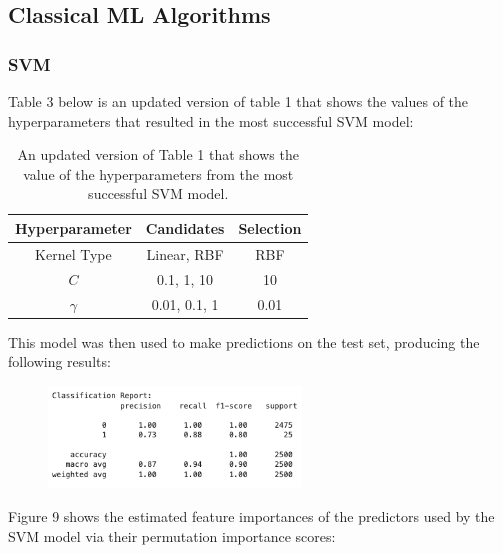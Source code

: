 \documentclass[11pt, oneside]{article}   	%
\begin{document}
\subsection{Classical ML Algorithms}



\subsubsection{SVM}

Table 3 below is an updated version of table 1 that shows the values of the hyperparameters that resulted in the most successful SVM model:

\begin{table}[h!]
    \centering
    \begin{tabular}{|c|c|c|}
        \hline
        \textbf{Hyperparameter} & \textbf{Candidates} & \textbf{Selection} \\ \hline
        Kernel Type & Linear, RBF & RBF \\ \hline
        $C$  & 0.1, 1, 10 & 10 \\ \hline
        $\gamma$ & 0.01, 0.1, 1 & 0.01 \\ \hline
    \end{tabular}
    \caption{An updated version of Table 1 that shows the value of the hyperparameters from the most successful SVM model.}
    \label{tab3}
\end{table}

This model was then used to make predictions on the test set, producing the following results:

\begin{figure}[h!]
	\centering
	\includegraphics[width=0.6\textwidth]{figures/svm_results.png}
\end{figure}

Figure 9 shows the estimated feature importances of the predictors used by the SVM model via their permutation importance scores: 
\end{document}
